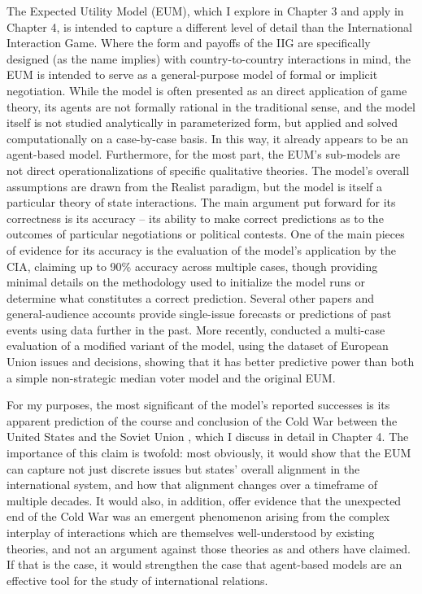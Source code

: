 The Expected Utility Model (EUM), which I explore in Chapter 3 and apply in Chapter 4, is intended to capture a different level of detail than the International Interaction Game. Where the form and payoffs of the IIG are specifically designed (as the name implies) with country-to-country interactions in mind, the EUM is intended to serve as a general-purpose model of formal or implicit negotiation. While the model is often presented as an direct application of game theory, its agents are not formally rational in the traditional sense, and the model itself is not studied analytically in parameterized form, but applied and solved computationally on a case-by-case basis. In this way, it already appears to be an agent-based model. Furthermore, for the most part, the EUM's sub-models are not direct operationalizations of specific qualitative theories. The model's overall assumptions are drawn from the Realist paradigm, but the model is itself a particular theory of state interactions. The main argument put forward for its correctness is its accuracy -- its ability to make correct predictions as to the outcomes of particular negotiations or political contests. One of the main pieces of evidence for its accuracy is the \citet{feder_1992} evaluation of the model's application by the CIA, claiming up to 90\% accuracy across multiple cases, though providing minimal details on the methodology used to initialize the model runs or determine what constitutes a correct prediction. Several other papers \citep[e.g.][]{bdm_1984,bdm_1997} and general-audience accounts \citep{bdm_2010} provide single-issue forecasts or predictions of past events using data further in the past. More recently, \citet{bdm_2011} conducted a multi-case evaluation of a modified variant of the model, using the \citet{thomson_2006} dataset of European Union issues and decisions, showing that it has better predictive power than both a simple non-strategic median voter model and the original EUM.

For my purposes, the most significant of the model's reported successes is its apparent prediction of the course and conclusion of the Cold War between the United States and the Soviet Union \citep{bdm_1998}, which I discuss in detail in Chapter 4. The importance of this claim is twofold: most obviously, it would show that the EUM can capture not just discrete issues but states' overall alignment in the international system, and how that alignment changes over a timeframe of multiple decades. It would also, in addition, offer evidence that the unexpected end of the Cold War was an emergent phenomenon arising from the complex interplay of interactions which are themselves well-understood by existing theories, and not an argument against those theories as \citet{gaddis_1992} and others have claimed. If that is the case, it would strengthen the case that agent-based models are an effective tool for the study of international relations.

